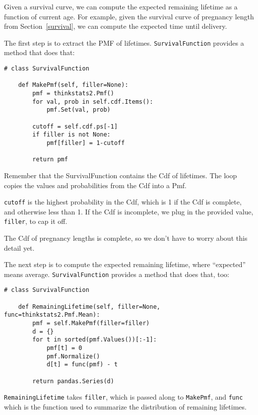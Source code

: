 \documentclass[12pt]{book}
\begin{document}
Given a survival curve, we can compute the expected remaining
lifetime as a function of current age.  For example, given the
survival curve of pregnancy length from Section~\ref{survival},
we can compute the expected time until delivery.

The first step is to extract the PMF of lifetimes.  {\tt SurvivalFunction}
provides a method that does that:

\begin{verbatim}
# class SurvivalFunction

    def MakePmf(self, filler=None):
        pmf = thinkstats2.Pmf()
        for val, prob in self.cdf.Items():
            pmf.Set(val, prob)

        cutoff = self.cdf.ps[-1]
        if filler is not None:
            pmf[filler] = 1-cutoff

        return pmf
\end{verbatim}

Remember that the SurvivalFunction contains the Cdf of lifetimes.
The loop copies the values and probabilities from the Cdf into
a Pmf.

{\tt cutoff} is the highest probability in the Cdf, which is 1
if the Cdf is complete, and otherwise less than 1.  
If the Cdf is incomplete, we plug in the provided value, {\tt filler},
to cap it off.

The Cdf of pregnancy lengths is complete, so we don't have to worry
about this detail yet.

The next step is to compute the expected remaining lifetime, where
``expected'' means average.  {\tt SurvivalFunction}
provides a method that does that, too:

\begin{verbatim}
# class SurvivalFunction

    def RemainingLifetime(self, filler=None, func=thinkstats2.Pmf.Mean):
        pmf = self.MakePmf(filler=filler)
        d = {}
        for t in sorted(pmf.Values())[:-1]:
            pmf[t] = 0
            pmf.Normalize()
            d[t] = func(pmf) - t

        return pandas.Series(d)
\end{verbatim}

{\tt RemainingLifetime} takes {\tt filler}, which is passed along
to {\tt MakePmf}, and {\tt func} which is the function used to
summarize the distribution of remaining lifetimes.
\end{document}
